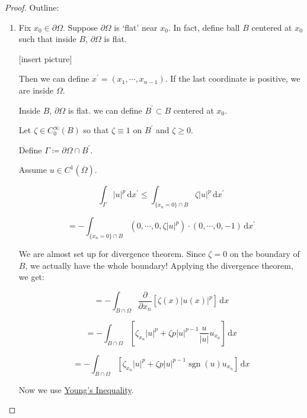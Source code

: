 \documentclass{article}
\theoremstyle{definition}
\newcommand{\sgn}{\operatorname{sgn}}
\begin{document}
\begin{proof}

    Outline:

    \begin{enumerate}[label=\arabic*)]
        \item Fix \(x_0 \in \partial \Omega\). Suppose \(\partial \Omega\) is `flat' near \(x_0\). In fact, define ball \(B\) centered at \(x_0\) such that inside \(B\), \(\partial \Omega\) is flat.
        
        [insert picture]

        Then we can define \(x^{\prime}  = (x_1, \cdots , x_{n-1})\). If the last coordinate is positive, we are inside \(\Omega\).

        Inside \(B\), \(\partial \Omega\) is flat. we can define \(B^{\prime} \subset B\) centered at \(x_0\).

        Let \(\zeta \in C_0^{\infty} (B)\) so that \(\zeta \equiv 1\) on \(B^{\prime}\) and \(\zeta \geq 0\).

        Define \(\Gamma \coloneqq \partial \Omega \cap B^{\prime}\).
        
        Assume \(u \in C^1(\overline{\Omega })\).

        \[
            \int_{\Gamma}^{} \vert u \vert ^ p \,\mathrm{d}x ^{\prime} \leq \int_{\{ x_n = 0 \} \cap B}^{} \zeta\vert u \vert ^p \,\mathrm{d}x^{\prime}  
        \]

        \[
            = - \int_{\{ x_n = 0 \} \cap B}^{} (0, \cdots , 0, \zeta \vert u \vert ^ p) \cdot (0, \cdots , 0, -1) \,\mathrm{d}x^{\prime} 
        \]

        We are almost set up for divergence theorem. Since \(\zeta = 0\) on the boundary of \(B\), we actually have the whole boundary! Applying the divergence theorem, we get:

        \[
            = - \int_{B \cap \Omega}^{} \frac{\partial}{\partial x_n} \left[ \zeta (x) \vert u(x) \vert ^ p \right]  \,\mathrm{d}x 
        \]

        \[
            = - \int_{B \cap \Omega}^{} \left[ \zeta_{x_n} \vert u \vert ^ p + \zeta p \vert u \vert ^{p-1} \frac{u}{\vert u \vert } u_{x_n} \right] \,\mathrm{d}x 
        \]

        \[
            = - \int_{B \cap \Omega}^{} \left[ \zeta_{x_n} \vert u \vert ^ p + \zeta p \vert u \vert ^{p-1} \sgn(u) u_{x_n} \right] \,\mathrm{d}x 
        \]

        Now we use \underline{Young's Inequality}.
        

\end{enumerate}
\end{proof}
\end{document}
